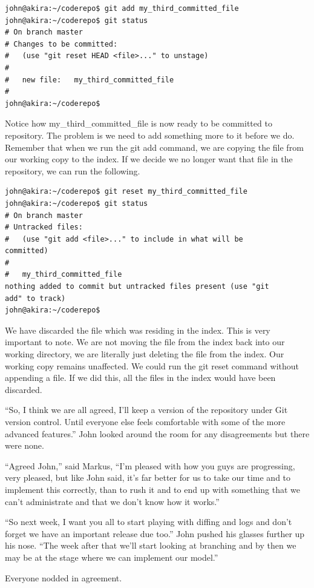 \begin{Verbatim}[frame=single,fontsize=\relsize{-3}] 
john@akira:~/coderepo$ git add my_third_committed_file
john@akira:~/coderepo$ git status
# On branch master
# Changes to be committed:
#   (use "git reset HEAD <file>..." to unstage)
#
#	new file:   my_third_committed_file
#
john@akira:~/coderepo$ 
\end{Verbatim} 

Notice how my\_third\_committed\_file is now ready to be committed to repository.  The problem is we need to add something more to it before we do.  Remember that when we run the git add command, we are copying the file from our working copy to the index.  If we decide we no longer want that file in the repository, we can run the following.  

\begin{Verbatim}[frame=single,fontsize=\relsize{-3}] 
john@akira:~/coderepo$ git reset my_third_committed_file
john@akira:~/coderepo$ git status
# On branch master
# Untracked files:
#   (use "git add <file>..." to include in what will be 
committed)
#
#	my_third_committed_file
nothing added to commit but untracked files present (use "git 
add" to track)
john@akira:~/coderepo$ 
\end{Verbatim}

We have discarded the file which was residing in the index.  This is very important to note.  We are not moving the file from the index back into our working directory, we are literally just deleting the file from the index.  Our working copy remains unaffected.  We could run the git reset command without appending a file.  If we did this, all the files in the index would have been discarded.  

\begin{trenches}
``So, I think we are all agreed, I'll keep a version of the repository under Git version control.  Until everyone else feels comfortable with some of the more advanced features.''  John looked around the room for any disagreements but there were none.

``Agreed John,'' said Markus, ``I'm pleased with how you guys are progressing, very pleased, but like John said, it's far better for us to take our time and to implement this correctly, than to rush it and to end up with something that we can't administrate and that we don't know how it works.''

``So next week, I want you all to start playing with diffing and logs and don't forget we have an important release due too.''  John pushed his glasses further up his nose.  ``The week after that we'll start looking at branching and by then we may be at the stage where we can implement our model.''

Everyone nodded in agreement.
\end{trenches}

